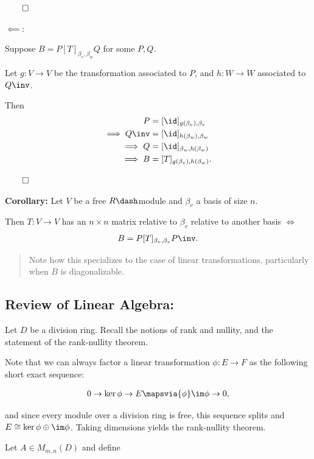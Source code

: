\(\qed\)

\(\impliedby\):

Suppose \(B = P [T]_{\beta_v, \beta_w} Q\) for some \(P, Q\).

Let \(g: V\to V\) be the transformation associated to \(P\), and
\(h: W \to W\) associated to \(Q\inv\).

Then \begin{align*}
P &= [\id]_{g(\beta_v), \beta_v}  \\
\implies Q\inv &= [\id]_{h(\beta_w), \beta_w} \\
\implies Q &= [\id]_{\beta_w, h(\beta_w)} \\
\implies B &= [T]_{g(\beta_v), h(\beta_w)}
.\end{align*}

\(\qed\)

\textbf{Corollary:} Let \(V\) be a free \(R\dash\)module and \(\beta_v\)
a basis of size \(n\).

Then \(T: V\to V\) has an \(n\times n\) matrix relative to \(\beta_v\)
relative to another basis \(\iff\)
\begin{align*}
B = P [T]_{\beta_v, \beta_v} P\inv
.\end{align*}

\begin{quote}
Note how this specializes to the case of linear transformations,
particularly when \(B\) is diagonalizable.
\end{quote}

\hypertarget{review-of-linear-algebra}{%
\subsection{Review of Linear Algebra:}\label{review-of-linear-algebra}}

Let \(D\) be a division ring. Recall the notions of rank and nullity,
and the statement of the rank-nullity theorem.

Note that we can always factor a linear transformation \(\phi: E\to F\)
as the following short exact sequence:

\begin{align*}
0 \to \ker \phi \to E \mapsvia{\phi} \im \phi \to 0,
\end{align*}

and since every module over a division ring is free, this sequence
splits and \(E \cong \ker\phi \oplus \im \phi\). Taking dimensions
yields the rank-nullity theorem.

Let \(A\in M_{m, n}(D)\) and define


